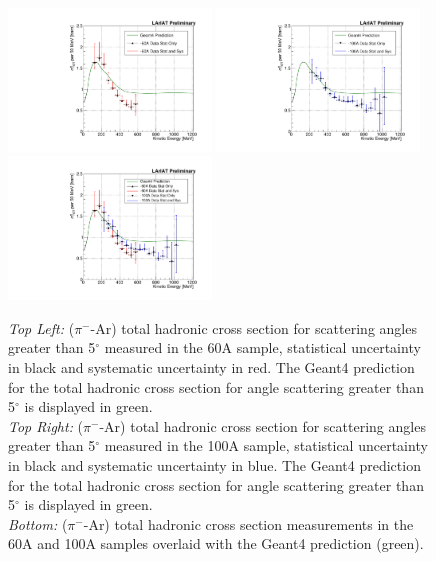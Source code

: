 \begin{figure}[htb]
\centering
\includegraphics[width=0.48\textwidth]{Chapter-6/Images/TheMoneyPlot60A.pdf}
\includegraphics[width=0.48\textwidth]{Chapter-6/Images/TheMoneyPlot100A.pdf}
\includegraphics[width=0.48\textwidth]{Chapter-6/Images/TheMoneyPlot.pdf}
\caption{ \emph{Top Left:} ($\pi^-$-Ar) total hadronic cross section for  scattering angles greater than 5$^\circ$ measured in the 60A sample, statistical uncertainty in black and systematic uncertainty in red. The Geant4 prediction for the total hadronic cross section for angle scattering greater than 5$^\circ$ is displayed in green. \\ 
\emph{Top Right:} ($\pi^-$-Ar) total hadronic cross section for  scattering angles greater than 5$^\circ$ measured in the 100A sample, statistical uncertainty in black and systematic uncertainty in blue. The Geant4 prediction for the total hadronic cross section for angle scattering greater than 5$^\circ$ is displayed in green.\\
\emph{Bottom:} ($\pi^-$-Ar) total hadronic cross section measurements in the 60A and 100A samples overlaid with the  Geant4 prediction (green).}
\label{fig:FinalXSPion}
\end{figure}

